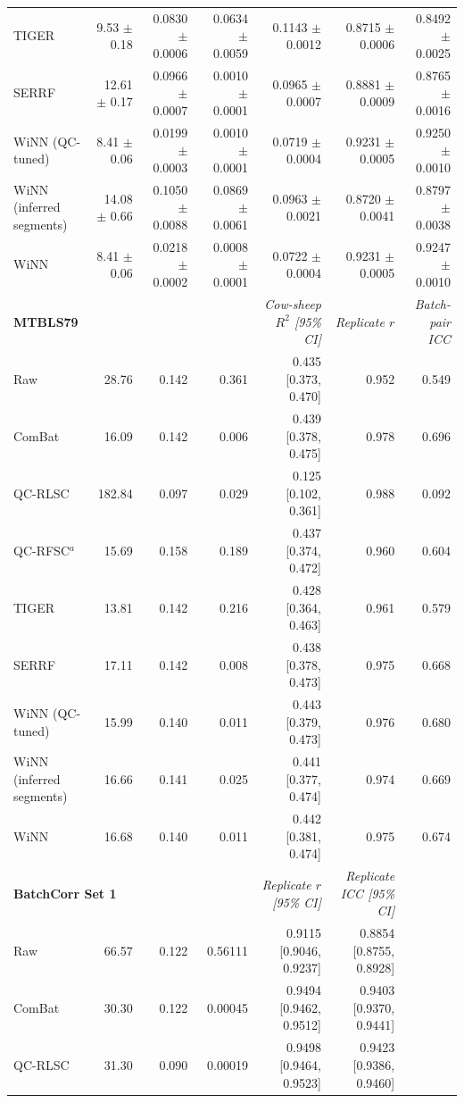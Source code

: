 \begin{landscape}
\begin{longtable}{lrrrrrr}
TIGER & 9.53 $\pm$ 0.18 & 0.0830 $\pm$ 0.0006 & 0.0634 $\pm$ 0.0059 & 0.1143 $\pm$ 0.0012 & 0.8715 $\pm$ 0.0006 & 0.8492 $\pm$ 0.0025 \\
SERRF & 12.61 $\pm$ 0.17 & 0.0966 $\pm$ 0.0007 & 0.0010 $\pm$ 0.0001 & 0.0965 $\pm$ 0.0007 & 0.8881 $\pm$ 0.0009 & 0.8765 $\pm$ 0.0016 \\
WiNN (QC-tuned) & 8.41 $\pm$ 0.06 & 0.0199 $\pm$ 0.0003 & 0.0010 $\pm$ 0.0001 & 0.0719 $\pm$ 0.0004 & 0.9231 $\pm$ 0.0005 & 0.9250 $\pm$ 0.0010 \\
WiNN (inferred segments) & 14.08 $\pm$ 0.66 & 0.1050 $\pm$ 0.0088 & 0.0869 $\pm$ 0.0061 & 0.0963 $\pm$ 0.0021 & 0.8720 $\pm$ 0.0041 & 0.8797 $\pm$ 0.0038 \\
WiNN & 8.41 $\pm$ 0.06 & 0.0218 $\pm$ 0.0002 & 0.0008 $\pm$ 0.0001 & 0.0722 $\pm$ 0.0004 & 0.9231 $\pm$ 0.0005 & 0.9247 $\pm$ 0.0010 \\
\midrule
\multicolumn{4}{l}{\textbf{MTBLS79}} & \textit{Cow-sheep $R^2$ [95\% CI]} & \textit{Replicate $r$} & \textit{Batch-pair ICC} \\
\midrule
Raw & 28.76 & 0.142 & 0.361 & 0.435 [0.373, 0.470] & 0.952 & 0.549 \\
ComBat & 16.09 & 0.142 & 0.006 & 0.439 [0.378, 0.475] & 0.978 & 0.696 \\
QC-RLSC & 182.84 & 0.097 & 0.029 & 0.125 [0.102, 0.361] & 0.988 & 0.092 \\
QC-RFSC$^{a}$ & 15.69 & 0.158 & 0.189 & 0.437 [0.374, 0.472] & 0.960 & 0.604 \\
TIGER & 13.81 & 0.142 & 0.216 & 0.428 [0.364, 0.463] & 0.961 & 0.579 \\
SERRF & 17.11 & 0.142 & 0.008 & 0.438 [0.378, 0.473] & 0.975 & 0.668 \\
WiNN (QC-tuned) & 15.99 & 0.140 & 0.011 & 0.443 [0.379, 0.473] & 0.976 & 0.680 \\
WiNN (inferred segments) & 16.66 & 0.141 & 0.025 & 0.441 [0.377, 0.474] & 0.974 & 0.669 \\
WiNN & 16.68 & 0.140 & 0.011 & 0.442 [0.381, 0.474] & 0.975 & 0.674 \\
\midrule
\multicolumn{4}{l}{\textbf{BatchCorr Set 1}} & \textit{Replicate $r$ [95\% CI]} & \textit{Replicate ICC [95\% CI]} &  \\
\midrule
Raw & 66.57 & 0.122 & 0.56111 & 0.9115 [0.9046, 0.9237] & 0.8854 [0.8755, 0.8928] &  \\
ComBat & 30.30 & 0.122 & 0.00045 & 0.9494 [0.9462, 0.9512] & 0.9403 [0.9370, 0.9441] &  \\
QC-RLSC & 31.30 & 0.090 & 0.00019 & 0.9498 [0.9464, 0.9523] & 0.9423 [0.9386, 0.9460] &  \\

\end{longtable}
\end{landscape}
